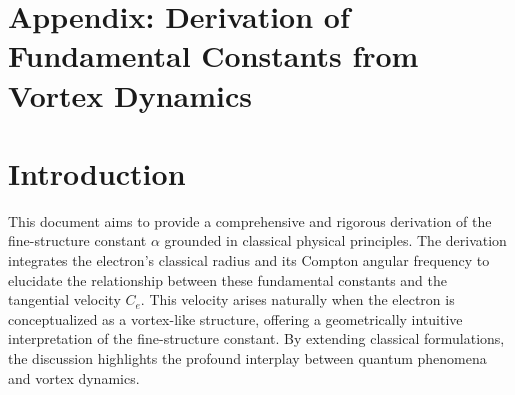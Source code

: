 
%
%
%
%
%
%
%
%
%
\section{\textbf{Appendix: Derivation of Fundamental Constants from Vortex Dynamics}}
    \label{sec:appendix:1}

    \section*{Introduction}
    This document aims to provide a comprehensive and rigorous derivation of the fine-structure constant $\alpha$ grounded in classical physical principles.
    The derivation integrates the electron's classical radius and its Compton angular frequency to elucidate the relationship between these fundamental constants and the tangential velocity $C_e$.
    This velocity arises naturally when the electron is conceptualized as a vortex-like structure, offering a geometrically intuitive interpretation of the fine-structure constant.
    By extending classical formulations, the discussion highlights the profound interplay between quantum phenomena and vortex dynamics.


